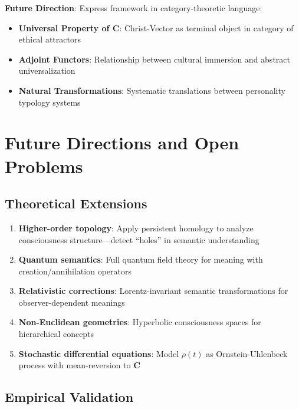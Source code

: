 \documentclass[11pt,a4paper]{article}
\theoremstyle{definition}
\theoremstyle{remark}
\begin{document}
\textbf{Future Direction}: Express framework in category-theoretic language:

\begin{itemize}
\item \textbf{Universal Property of \(\mathbf{C}\)}: Christ-Vector as terminal object in category of ethical attractors
\item \textbf{Adjoint Functors}: Relationship between cultural immersion and abstract universalization
\item \textbf{Natural Transformations}: Systematic translations between personality typology systems
\end{itemize}

\section{Future Directions and Open Problems}

\subsection{Theoretical Extensions}

\begin{enumerate}
\item \textbf{Higher-order topology}: Apply persistent homology to analyze consciousness structure—detect ``holes'' in semantic understanding

\item \textbf{Quantum semantics}: Full quantum field theory for meaning with creation/annihilation operators

\item \textbf{Relativistic corrections}: Lorentz-invariant semantic transformations for observer-dependent meanings

\item \textbf{Non-Euclidean geometries}: Hyperbolic consciousness spaces for hierarchical concepts

\item \textbf{Stochastic differential equations}: Model \(\rho(t)\) as Ornstein-Uhlenbeck process with mean-reversion to \(\mathbf{C}\)
\end{enumerate}

\subsection{Empirical Validation}
\end{document}
